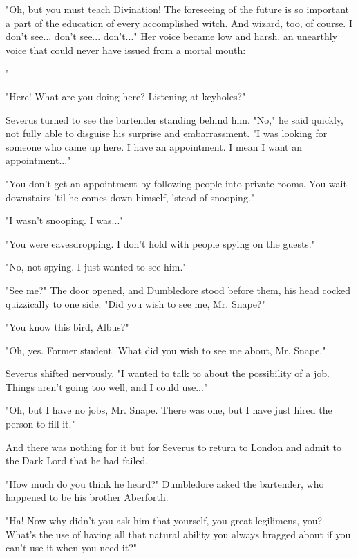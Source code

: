 \documentclass[a4paper,11pt]{article}
\begin{document}
"Oh, but you must teach Divination! The foreseeing of the future is so important a part of the education of every accomplished witch. And wizard, too, of course. I don't see... don't see... don't..." Her voice became low and harsh, an unearthly voice that could never have issued from a mortal mouth:


"

"Here! What are you doing here? Listening at keyholes?"

Severus turned to see the bartender standing behind him. "No," he said quickly, not fully able to disguise his surprise and embarrassment. "I was looking for someone who came up here. I have an appointment. I mean I want an appointment..."

"You don't get an appointment by following people into private rooms. You wait downstairs 'til he comes down himself, 'stead of snooping."

"I wasn't snooping. I was..."

"You were eavesdropping. I don't hold with people spying on the guests."

"No, not spying. I just wanted to see him."

"See me?" The door opened, and Dumbledore stood before them, his head cocked quizzically to one side. "Did you wish to see me, Mr. Snape?"

"You know this bird, Albus?"

"Oh, yes. Former student. What did you wish to see me about, Mr. Snape."

Severus shifted nervously. "I wanted to talk to about the possibility of a job. Things aren't going too well, and I could use..."

"Oh, but I have no jobs, Mr. Snape. There was one, but I have just hired the person to fill it."

And there was nothing for it but for Severus to return to London and admit to the Dark Lord that he had failed.

"How much do you think he heard?" Dumbledore asked the bartender, who happened to be his brother Aberforth.

"Ha! Now why didn't you ask him that yourself, you great legilimens, you? What's the use of having all that natural ability you always bragged about if you can't use it when you need it?"
\end{document}
